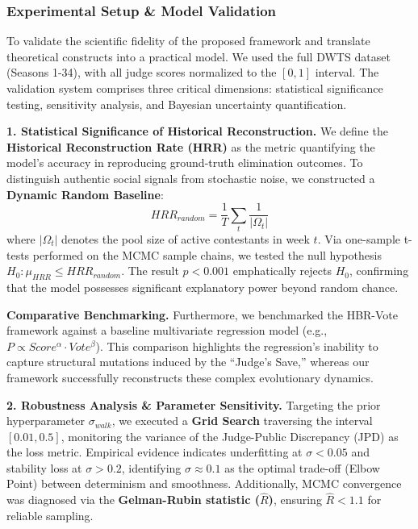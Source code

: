 \documentclass{mcmthesis}
\begin{document}
\subsubsection{Experimental Setup \& Model Validation}

To validate the scientific fidelity of the proposed framework and translate theoretical constructs into a practical model. We used the full DWTS dataset (Seasons 1-34), with all judge scores normalized to the $[0,1]$ interval. The validation system comprises three critical dimensions: statistical significance testing, sensitivity analysis, and Bayesian uncertainty quantification.

\noindent \textbf{1. Statistical Significance of Historical Reconstruction.} 
We define the \textbf{Historical Reconstruction Rate (HRR)} as the metric quantifying the model's accuracy in reproducing ground-truth elimination outcomes. To distinguish authentic social signals from stochastic noise, we constructed a \textbf{Dynamic Random Baseline}:
\begin{equation}
	HRR_{random} = \frac{1}{T} \sum_{t} \frac{1}{|\Omega_t|}
\end{equation}
\noindent where $|\Omega_t|$ denotes the pool size of active contestants in week $t$. Via one-sample t-tests performed on the MCMC sample chains, we tested the null hypothesis $H_0: \mu_{HRR} \leq HRR_{random}$. The result $p < 0.001$ emphatically rejects $H_0$, confirming that the model possesses significant explanatory power beyond random chance.

\noindent \textbf{Comparative Benchmarking.} 
Furthermore, we benchmarked the HBR-Vote framework against a baseline multivariate regression model (e.g., $P \propto Score^\alpha \cdot Vote^\beta$). This comparison highlights the regression's inability to capture structural mutations induced by the ``Judge's Save,'' whereas our framework successfully reconstructs these complex evolutionary dynamics.

\vspace{-0.1cm}
\noindent \textbf{2. Robustness Analysis \& Parameter Sensitivity.} 
Targeting the prior hyperparameter $\sigma_{walk}$, we executed a \textbf{Grid Search} traversing the interval $[0.01, 0.5]$, monitoring the variance of the Judge-Public Discrepancy (JPD) as the loss metric. Empirical evidence indicates underfitting at $\sigma < 0.05$ and stability loss at $\sigma > 0.2$, identifying $\sigma \approx 0.1$ as the optimal trade-off (Elbow Point) between determinism and smoothness. Additionally, MCMC convergence was diagnosed via the \textbf{Gelman-Rubin statistic ($\hat{R}$)}, ensuring $\hat{R} < 1.1$ for reliable sampling.
\end{document}
